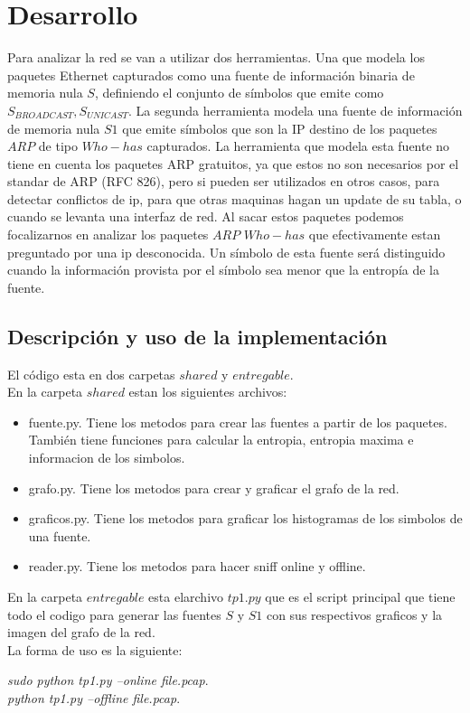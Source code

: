 \section{Desarrollo}

\PARstart Para analizar la red se van a utilizar dos herramientas. Una que modela los paquetes Ethernet
capturados como una fuente de información binaria de memoria nula $S$, 
definiendo el conjunto de símbolos que emite como ${S_{BROADCAST}, S_{UNICAST}}$.
La segunda herramienta modela una fuente de información de memoria nula $S1$ 
que emite símbolos que son la IP destino de los paquetes $ARP$ de tipo $Who-has$ capturados. La herramienta que modela esta fuente no tiene en cuenta los paquetes ARP gratuitos, ya que estos no son necesarios por el standar de ARP (RFC 826), pero si pueden ser utilizados en otros casos, para detectar conflictos de ip, para que otras maquinas hagan un update de su tabla, o cuando se levanta una interfaz de red. Al sacar estos paquetes podemos focalizarnos en analizar los paquetes $ARP$ $Who-has$ que efectivamente estan preguntado por una ip desconocida.
Un símbolo de esta fuente será distinguido cuando la información provista
por el símbolo sea menor que la entropía de la fuente.

\subsection{Descripción y uso de la implementación} 
El código esta en dos carpetas $shared$ y $entregable$.\\

En la carpeta $shared$ estan los siguientes archivos:

\begin{itemize}
\item fuente.py. Tiene los metodos para crear las fuentes a partir de los paquetes. También tiene funciones para calcular la entropia, entropia maxima e informacion de los simbolos.
\item grafo.py. Tiene los metodos para crear y graficar el grafo de la red.
\item graficos.py. Tiene los metodos para graficar los histogramas de los simbolos de una fuente.
\item reader.py. Tiene los metodos para hacer sniff online y offline.
\end{itemize}

En la carpeta $entregable$ esta elarchivo $tp1.py$ que es el script principal que tiene todo el codigo para generar las fuentes $S$ y $S1$ con sus respectivos graficos y la imagen del grafo de la red.\\

La forma de uso es la siguiente:

\textit{sudo python tp1.py --online file.pcap}.\\
\textit{python tp1.py --offline file.pcap}.

